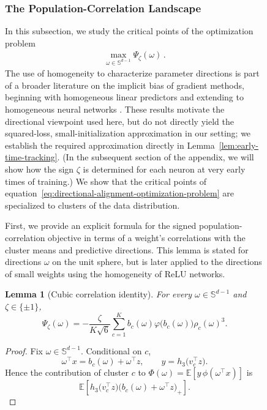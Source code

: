 \documentclass{article}
\def\eqref#1{equation~\ref{#1}}
\newcounter{setting}[section]
\newcounter{initialization}[section]
\newtheorem{lemma}[lemma]{Lemma}
\begin{document}
\begin{figure}
\subsubsection{The Population-Correlation Landscape}

In this subsection, we study the critical points of the optimization problem
\begin{align}\label{eq:directional-alignment-optimization-problem}
\max_{\omega \in \mathbb{S}^{d-1}} \Psi_{\zeta}(\omega)\,.
\end{align}
The use of homogeneity to characterize parameter directions
is part of a broader literature on the implicit bias of gradient methods,
beginning with homogeneous linear predictors and extending to homogeneous
neural networks
\citep{soudry2018implicit,ji2019implicit,lyu2020gradient,ji2020directional}.
These results motivate the directional viewpoint used here, but do not
directly yield the squared-loss, small-initialization approximation in our
setting; we establish the required approximation directly in
Lemma~\ref{lem:early-time-tracking}. (In the subsequent section of the appendix, we will show how the sign $\zeta$ is determined for each neuron at very early times of training.) We show that the critical points of \eqref{eq:directional-alignment-optimization-problem} are specialized to clusters of the data distribution.

First, we provide an explicit formula for the signed population-correlation objective in terms of a weight's correlations with the cluster means and predictive directions. This lemma is stated for directions $\omega$ on the unit sphere, but is later applied to the directions of small weights using the homogeneity of ReLU networks.

\begin{lemma}[Cubic correlation identity]
\label{lem:cubic-correlation-identity}
For every $\omega\in\mathbb S^{d-1}$ and $\zeta\in\{\pm1\}$,
\[
    \Psi_\zeta(\omega)
    =
    -\frac{\zeta}{K\sqrt6}
    \sum_{c=1}^K
    b_c(\omega)\varphi\bigl(b_c(\omega)\bigr)\rho_c(\omega)^3.
\]
\end{lemma}

\begin{proof}
Fix $\omega\in\mathbb S^{d-1}$. Conditional on $c$,
\[
    \omega^\top x
    =b_c(\omega)
      +\omega^\top z,
    \qquad
    y=h_3\bigl(v_c^\top z\bigr).
\]
Hence the contribution of cluster $c$ to $\Phi(\omega) = \mathbb E\left[y\,
      \phi(\omega^\top x)\right]$ is
\[\mathbb E\left[
        h_3\bigl(v_c^\top z\bigr)
        \bigl(b_c(\omega)
          +\omega^\top z\bigr)_+
    \right].
\]


\end{proof}
\end{figure}
\end{document}
